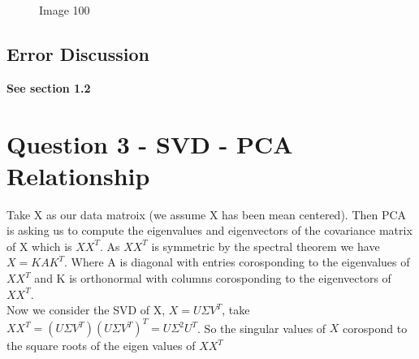 \documentclass[11pt, a4]{article}
\begin{document}
\begin{figure}[H]
	\centering
	\qquad
	\qquad
	\qquad
	\qquad
	\caption{Image 100}
\end{figure}

\subsection{Error Discussion}
\textbf{See section 1.2}

\section{Question 3 - SVD - PCA Relationship}
Take X as our data matroix (we assume X has been mean centered). Then PCA is asking us to compute the eigenvalues and eigenvectors of the covariance matrix of X which is
$XX^T$. As $XX^T$ is symmetric by the spectral theorem we have $X = K A K^T$. Where A is diagonal with entries corosponding to the eigenvalues of $XX^T$ and K is orthonormal with columns corosponding to the eigenvectors of $XX^T$.\\

Now we consider the SVD of X, $X = U \Sigma V^T$, take $XX^T = (U \Sigma V^T)(U \Sigma V^T)^T = U \Sigma^2 U^T$. So the singular values of $X$ corospond to the square roots of the eigen values of $XX^T$
\end{document}

